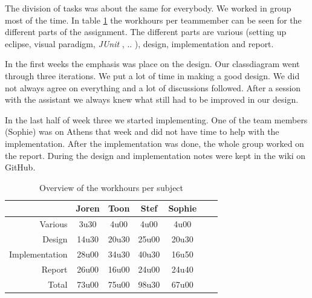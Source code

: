 \documentclass[i2]{oss}
\newcommand{\junit}{\emph{JUnit }}
\begin{document}
The division of tasks was about the same for everybody. We worked in group most of the time. In table \ref{tab:werkuren} the workhours per teammember can be seen for the different parts of the assignment. The different parts are various (setting up eclipse, visual paradigm, \junit, .. ), design, implementation and report. 

In the first weeks the emphasis was place on the design. Our classdiagram went through three iterations. We put a lot of time in making a good design. We did not always agree on everything and a lot of discussions followed. After a session with the assistant we always knew what still had to be improved in our design.

In the last half of week three we started implementing. One of the team members (Sophie) was on Athens that week and did not have time to help with the implementation. After the implementation was done, the whole group worked on the report. During the design and implementation notes were kept in the wiki on GitHub.


\begin{table}[h!]
\begin{center}
    \begin{tabular}{ r | c  c  c  c  c  c}
     & Joren & Toon & Stef & Sophie \\ \hline
    	Various & 		3u30 & 4u00 & 4u00 & 4u00\\
        Design & 		14u30 & 20u30 & 25u00 & 20u30 \\
        Implementation & 28u00 & 34u30 & 40u30 & 16u50\\
        Report & 		26u00 & 16u00 & 24u00 & 24u40 \\
        Total & 		73u00 & 75u00 & 98u30 & 67u00  
    \end{tabular}
    \caption{Overview of the workhours per subject}
    \label{tab:werkuren}
\end{center}
\end{table}
\end{document}
